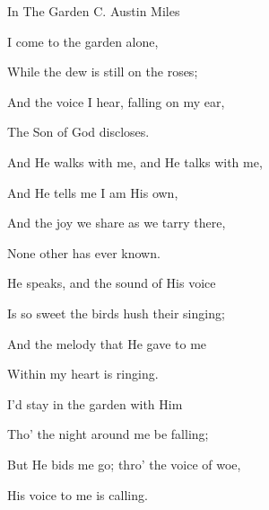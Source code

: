 \documentclass[12pt]{book}
\begin{document}
\begin{song}{In The Garden}{}
  {\SBPubDom}
  {C. Austin Miles}
  {}
  {}

  \begin{SBVerse}
    I come to the garden alone,

    While the dew is still on the roses;

    And the voice I hear, falling on my ear,

    The Son of God discloses.
  \end{SBVerse}

  \begin{SBOpGroup}
    And He walks with me, and He talks with me,

    And He tells me I am His own,

    And the joy we share as we tarry there,

    None other has ever known.
  \end{SBOpGroup}

  \begin{SBVerse}
    He speaks, and the sound of His voice

    Is so sweet the birds hush their singing;

    And the melody that He gave to me

    Within my heart is ringing.
  \end{SBVerse}

  \begin{SBVerse}
    I'd stay in the garden with Him

    Tho' the night around me be falling;

    But He bids me go; thro' the voice of woe,

    His voice to me is calling.
  \end{SBVerse}
\end{song}

\end{document}

